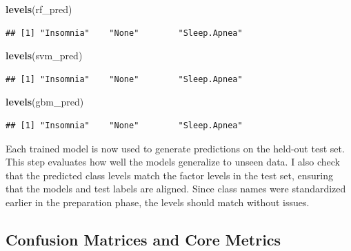 \documentclass[
]{article}
\newenvironment{Shaded}{\begin{snugshade}}{\end{snugshade}}
\newcommand{\FunctionTok}[1]{\textcolor[rgb]{0.13,0.29,0.53}{\textbf{#1}}}
\newcommand{\NormalTok}[1]{#1}
\newcommand{\OtherTok}[1]{\textcolor[rgb]{0.56,0.35,0.01}{#1}}
\newcommand{\SpecialCharTok}[1]{\textcolor[rgb]{0.81,0.36,0.00}{\textbf{#1}}}
\begin{document}
\begin{Shaded}
\begin{Highlighting}[]
\FunctionTok{levels}\NormalTok{(rf\_pred)}
\end{Highlighting}
\end{Shaded}

\begin{verbatim}
## [1] "Insomnia"    "None"        "Sleep.Apnea"
\end{verbatim}

\begin{Shaded}
\begin{Highlighting}[]
\FunctionTok{levels}\NormalTok{(svm\_pred)}
\end{Highlighting}
\end{Shaded}

\begin{verbatim}
## [1] "Insomnia"    "None"        "Sleep.Apnea"
\end{verbatim}

\begin{Shaded}
\begin{Highlighting}[]
\FunctionTok{levels}\NormalTok{(gbm\_pred)}
\end{Highlighting}
\end{Shaded}

\begin{verbatim}
## [1] "Insomnia"    "None"        "Sleep.Apnea"
\end{verbatim}

Each trained model is now used to generate predictions on the held-out
test set. This step evaluates how well the models generalize to unseen
data. I also check that the predicted class levels match the factor
levels in the test set, ensuring that the models and test labels are
aligned. Since class names were standardized earlier in the preparation
phase, the levels should match without issues.

\subsection{Confusion Matrices and Core
Metrics}\label{confusion-matrices-and-core-metrics}

\begin{Shaded}
\end{Shaded}
\end{document}
